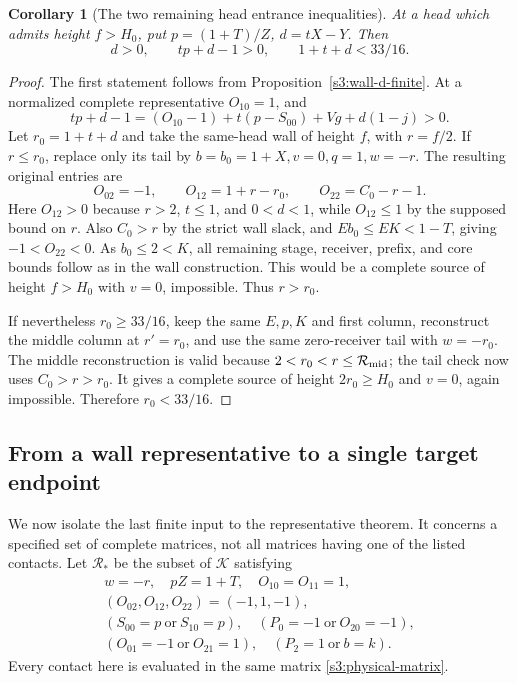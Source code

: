 \documentclass[11pt,reqno]{amsart}
\newtheorem{corollary}[theorem]{Corollary}
\theoremstyle{definition}
\theoremstyle{remark}
\begin{document}
\begin{corollary}[The two remaining head entrance inequalities]
\label{s3:wall-head-entrance}
At a head which admits height \(f>H_0\), put
\(p=(1+T)/Z\), \(d=tX-Y\). Then
\[
 d>0,\qquad tp+d-1>0,\qquad1+t+d<33/16.
\]
\end{corollary}
\begin{proof}
The first statement follows from
Proposition~\ref{s3:wall-d-finite}. At a normalized complete
representative \(O_{10}=1\), and
\[
 tp+d-1=(O_{10}-1)+t(p-S_{00})+Vg+d(1-j)>0.
\]
Let \(r_0=1+t+d\) and take the same-head wall of height \(f\),
with \(r=f/2\). If \(r\le r_0\), replace only its tail by
\(b=b_0=1+X,v=0,q=1,w=-r\). The resulting original entries are
\[
 O_{02}=-1,\qquad O_{12}=1+r-r_0,\qquad
 O_{22}=C_0-r-1.
\]
Here \(O_{12}>0\) because \(r>2\), \(t\le1\), and
\(0<d<1\), while \(O_{12}\le1\) by the supposed bound on \(r\).
Also \(C_0>r\) by the strict wall slack, and
\(Eb_0\le EK<1-T\), giving \(-1<O_{22}<0\).
As \(b_0\le2<K\), all remaining stage, receiver, prefix,
and core bounds follow as in the wall construction. This would
be a complete source of height \(f>H_0\) with \(v=0\), impossible.
Thus \(r>r_0\).

If nevertheless \(r_0\ge33/16\), keep the same \(E,p,K\)
and first column, reconstruct the middle column at \(r'=r_0\),
and use the same zero-receiver tail with \(w=-r_0\).
The middle reconstruction is valid because
\(2<r_0<r\le\mathcal R_{\rm mid}\); the tail check now uses
\(C_0>r>r_0\). It gives a complete source of height
\(2r_0\ge H_0\) and \(v=0\), again impossible.
Therefore \(r_0<33/16\).
\end{proof}

\subsection{From a wall representative to a single target endpoint}
\label{s3:target-endpoint-proof}

We now isolate the last finite input to the representative theorem.
It concerns a specified set of complete matrices, not all matrices
having one of the listed contacts. Let \(\mathcal R_*\) be the subset
of \(\mathcal K\) satisfying
\begin{equation}\label{s3:representative-set}
\begin{gathered}
 w=-r,\quad pZ=1+T,\quad O_{10}=O_{11}=1,\\
 (O_{02},O_{12},O_{22})=(-1,1,-1),\\
 (S_{00}=p\ \text{or}\ S_{10}=p),\quad
 (P_0=-1\ \text{or}\ O_{20}=-1),\\
 (O_{01}=-1\ \text{or}\ O_{21}=1),\quad
 (P_2=1\ \text{or}\ b=k).
\end{gathered}
\end{equation}
Every contact here is evaluated in the same matrix
\eqref{s3:physical-matrix}.
\end{document}
